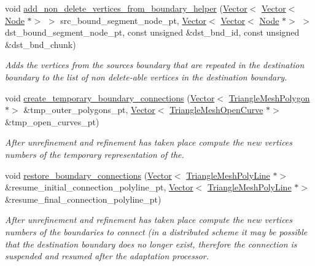 \begin{DoxyCompactItemize}
void \hyperlink{classoomph_1_1RefineableTriangleMesh_a2d290418f7617412aebc3d66bcace8b1}{add\+\_\+non\+\_\+delete\+\_\+vertices\+\_\+from\+\_\+boundary\+\_\+helper} (\hyperlink{classoomph_1_1Vector}{Vector}$<$ \hyperlink{classoomph_1_1Vector}{Vector}$<$ \hyperlink{classoomph_1_1Node}{Node} $\ast$$>$ $>$ src\+\_\+bound\+\_\+segment\+\_\+node\+\_\+pt, \hyperlink{classoomph_1_1Vector}{Vector}$<$ \hyperlink{classoomph_1_1Vector}{Vector}$<$ \hyperlink{classoomph_1_1Node}{Node} $\ast$$>$ $>$ dst\+\_\+bound\+\_\+segment\+\_\+node\+\_\+pt, const unsigned \&dst\+\_\+bnd\+\_\+id, const unsigned \&dst\+\_\+bnd\+\_\+chunk)
\begin{DoxyCompactList}\small\item\em Adds the vertices from the sources boundary that are repeated in the destination boundary to the list of non delete-\/able vertices in the destination boundary. \end{DoxyCompactList}\item 
void \hyperlink{classoomph_1_1RefineableTriangleMesh_aa0d2608c4671777754eb84c5083c9fcb}{create\+\_\+temporary\+\_\+boundary\+\_\+connections} (\hyperlink{classoomph_1_1Vector}{Vector}$<$ \hyperlink{classoomph_1_1TriangleMeshPolygon}{Triangle\+Mesh\+Polygon} $\ast$$>$ \&tmp\+\_\+outer\+\_\+polygons\+\_\+pt, \hyperlink{classoomph_1_1Vector}{Vector}$<$ \hyperlink{classoomph_1_1TriangleMeshOpenCurve}{Triangle\+Mesh\+Open\+Curve} $\ast$$>$ \&tmp\+\_\+open\+\_\+curves\+\_\+pt)
\begin{DoxyCompactList}\small\item\em After unrefinement and refinement has taken place compute the new vertices numbers of the temporary representation of the. \end{DoxyCompactList}\item 
void \hyperlink{classoomph_1_1RefineableTriangleMesh_a844986a9cfbce009209f0e01ef5f5918}{restore\+\_\+boundary\+\_\+connections} (\hyperlink{classoomph_1_1Vector}{Vector}$<$ \hyperlink{classoomph_1_1TriangleMeshPolyLine}{Triangle\+Mesh\+Poly\+Line} $\ast$$>$ \&resume\+\_\+initial\+\_\+connection\+\_\+polyline\+\_\+pt, \hyperlink{classoomph_1_1Vector}{Vector}$<$ \hyperlink{classoomph_1_1TriangleMeshPolyLine}{Triangle\+Mesh\+Poly\+Line} $\ast$$>$ \&resume\+\_\+final\+\_\+connection\+\_\+polyline\+\_\+pt)
\begin{DoxyCompactList}\small\item\em After unrefinement and refinement has taken place compute the new vertices numbers of the boundaries to connect (in a distributed scheme it may be possible that the destination boundary does no longer exist, therefore the connection is suspended and resumed after the adaptation processor. \end{DoxyCompactList}\item 

\end{DoxyCompactItemize}
